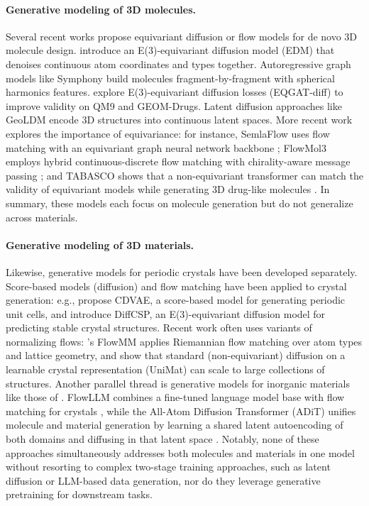 \documentclass{article}
\theoremstyle{plain}
\theoremstyle{definition}
\theoremstyle{remark}
\begin{document}
\paragraph{Generative modeling of 3D molecules.} Several recent works propose equivariant diffusion or flow models for de novo 3D molecule design. \citet{hoogeboom2022equivariant} introduce an E(3)-equivariant diffusion model (EDM) that denoises continuous atom coordinates and types together. Autoregressive graph models like Symphony \citep{daigavane2024symphony} build molecules fragment-by-fragment with spherical harmonics features. \citet{le2024navigating} explore E(3)-equivariant diffusion losses (EQGAT-diff) to improve validity on QM9 and GEOM-Drugs. Latent diffusion approaches like GeoLDM \citep{xu2023geometric} encode 3D structures into continuous latent spaces. More recent work explores the importance of equivariance: for instance, SemlaFlow uses flow matching with an equivariant graph neural network backbone \citep{irwin2025semlaflow}; FlowMol3 employs hybrid continuous-discrete flow matching with chirality-aware message passing \citep{Dunn2025FlowMol3}; and TABASCO shows that a non-equivariant transformer can match the validity of equivariant models while generating 3D drug-like molecules \citep{vonessen2025tabasco}. In summary, these models each focus on molecule generation but do not generalize across materials.

\paragraph{Generative modeling of 3D materials.} Likewise, generative models for periodic crystals have been developed separately. Score-based models (diffusion) and flow matching have been applied to crystal generation: e.g., \citet{xie2022crystal} propose CDVAE, a score-based model for generating periodic unit cells, and \citet{jiao2023crystal} introduce DiffCSP, an E(3)-equivariant diffusion model for predicting stable crystal structures. Recent work often uses variants of normalizing flows: \citet{miller2024flowmm}’s FlowMM applies Riemannian flow matching over atom types and lattice geometry, and \citet{yang2024scalable} show that standard (non-equivariant) diffusion on a learnable crystal representation (UniMat) can scale to large collections of structures. Another parallel thread is generative models for inorganic materials like those of \citet{zeni2025generative}. FlowLLM combines a fine-tuned language model base with flow matching for crystals \citep{sriram2024flowllm}, while the All-Atom Diffusion Transformer (ADiT) unifies molecule and material generation by learning a shared latent autoencoding of both domains and diffusing in that latent space \citep{joshi2025allatom}. Notably, none of these approaches simultaneously addresses both molecules and materials in one model without resorting to complex two-stage training approaches, such as latent diffusion or LLM-based data generation, nor do they leverage generative pretraining for downstream tasks.
\end{document}
